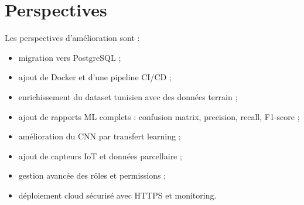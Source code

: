 \section*{Perspectives}
Les perspectives d'amélioration sont :
\begin{itemize}[noitemsep]
  \item migration vers PostgreSQL ;
  \item ajout de Docker et d'une pipeline CI/CD ;
  \item enrichissement du dataset tunisien avec des données terrain ;
  \item ajout de rapports ML complets : confusion matrix, precision, recall, F1-score ;
  \item amélioration du CNN par transfert learning ;
  \item ajout de capteurs IoT et données parcellaire ;
  \item gestion avancée des rôles et permissions ;
  \item déploiement cloud sécurisé avec HTTPS et monitoring.
\end{itemize}
